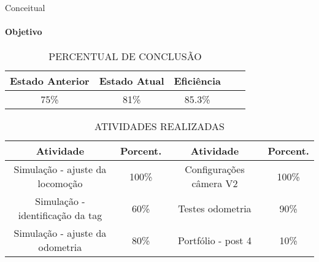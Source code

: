  \begin{frame}[t]{Conceitual} 
    \framesubtitle{Objetivo}
    \begin{table}[ht!]
    \centering
        \caption{PERCENTUAL DE CONCLUSÃO}
        \begin{tabular}{|c|c|c|c|c|} \hline
            \textbf{Estado Anterior}&\textbf{Estado Atual}&\textbf{Eficiência}\\\hline
            75\% &81\% &85.3\% \\ \hline
        \end{tabular}
    \end{table}
    \begin{table}[ht!]
            \caption{ATIVIDADES REALIZADAS}
            \begin{tabular}{|c|c|c|c|} \hline
                \textbf{Atividade}&\textbf{Porcent.}&\textbf{Atividade}&\textbf{Porcent.}\\\hline
                Simulação - ajuste da locomoção   &100\% &  Configurações câmera V2 &100\% \\ \hline
                Simulação - identificação da tag  &60\% &  Testes odometria         &90\% \\ \hline
                Simulação - ajuste da odometria   &80\% &  Portfólio - post 4 &10\% \\ \hline
            \end{tabular}
        \end{table}
\end{frame}
